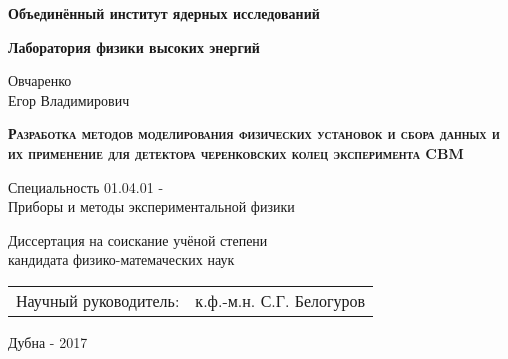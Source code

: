 \begin{titlepage}

\centering

\textbf{
Объединённый институт ядерных исследований
}


\textbf{
Лаборатория физики высоких энергий
}

\vspace{1cm}

Овчаренко \\
Егор Владимирович

\vspace{2cm}

\textbf{
\textsc{
Разработка методов моделирования физических установок и сбора данных и их применение для детектора черенковских колец эксперимента CBM
}
}

\vspace{2cm}

Специальность 01.04.01 - \\
Приборы и методы экспериментальной физики

\vspace{2cm}

Диссертация на соискание учёной степени \\
кандидата физико-матемаческих наук

\vspace{2cm}

\begin{tabu} to \textwidth { X[l] X[r] }
	{Научный руководитель:} & {к.ф.-м.н. С.Г. Белогуров} \\
\end{tabu}

\vspace{2cm}

Дубна - 2017

\end{titlepage}
